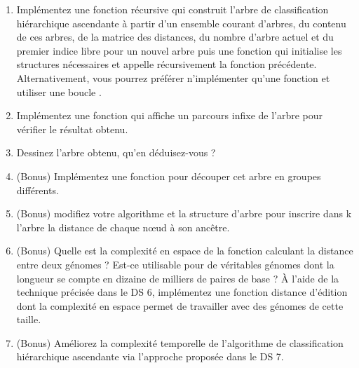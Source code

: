\documentclass[a4paper, 10pt]{article}
\begin{document}
\begin{enumerate}[resume]
\item Implémentez une fonction récursive  qui construit l'arbre de classification hiérarchique ascendante à partir d'un ensemble courant d'arbres, du contenu de ces arbres, de la matrice des distances, du nombre  d'arbre actuel et du premier indice libre pour un nouvel arbre  puis une fonction  qui initialise les structures nécessaires et appelle récursivement la fonction précédente. Alternativement, vous pourrez préférer n'implémenter qu'une fonction et utiliser une boucle .
\item Implémentez une fonction qui affiche un parcours infixe de l'arbre pour vérifier le résultat obtenu.
\item Dessinez l'arbre obtenu, qu'en déduisez-vous ?
\item (Bonus) Implémentez une fonction pour découper cet arbre en  groupes différents.
\item (Bonus) modifiez votre algorithme et la structure d'arbre pour inscrire dans k l'arbre la distance de chaque nœud à son ancêtre.
\item (Bonus) Quelle est la complexité en espace de la fonction calculant la distance entre deux génomes ? Est-ce utilisable pour de véritables génomes dont la longueur se compte en dizaine de milliers de paires de base ? À l'aide de la technique précisée dans le DS 6, implémentez une fonction distance d'édition dont la complexité en espace permet de travailler avec des génomes de cette taille.
\item (Bonus) Améliorez la complexité temporelle de l'algorithme de classification hiérarchique ascendante via l'approche proposée dans le DS 7.
\end{enumerate}
\end{document}
